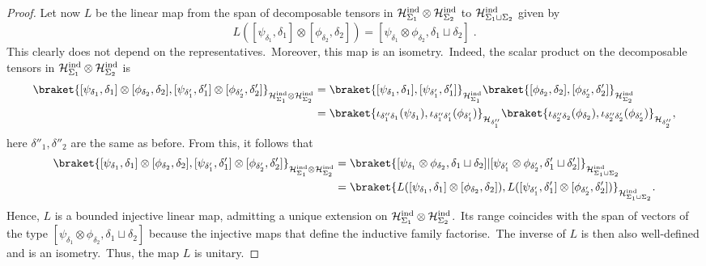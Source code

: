 \documentclass[11pt]{article}
\newcommand{\h}{\mathcal{H}}
\theoremstyle{definition}
\numberwithin{equation}{section}
\begin{document}
\begin{proof}
Let now $L$ be the linear map from the span of decomposable tensors in $\h_{\Sigma_1}^{\rm ind}\otimes\h_{\Sigma_2}^{\rm ind}$ to $\h_{\Sigma_1\sqcup\Sigma_2}^{\rm ind}$ given by
$$
L([\psi_{\delta_1},\delta_1]\otimes[\phi_{\delta_2},\delta_2])=[\psi_{\delta_1}\otimes\phi_{\delta_2} ,\delta_1\sqcup \delta_2]\;.
$$
This clearly does not depend on the representatives.~Moreover, this map is an isometry.~Indeed, the scalar product on the decomposable tensors in $\h_{\Sigma_1}^{\rm ind}\otimes\h_{\Sigma_2}^{\rm ind}$ is
    \begin{align*}
        \braket{[\psi_{\delta_1},\delta_1]\otimes[\phi_{\delta_2},\delta_2],[\psi_{\delta'_1},\delta'_1]\otimes[\phi_{\delta'_2},\delta'_2]}_{\h_{\Sigma_1}^{\rm ind}\otimes\h_{\Sigma_2}^{\rm ind}}&=\braket{[\psi_{\delta_1},\delta_1],[\psi_{\delta'_1},\delta'_1]}_{\h_{\Sigma_1}^{\rm ind}}\braket{[\phi_{\delta_2},\delta_2],[\phi_{\delta'_2},\delta'_2]}_{\h_{\Sigma_2}^{\rm ind}}\\
        &=\braket{\iota_{\delta''_1\delta_1}(\psi_{\delta_1}),\iota_{\delta''_1\delta'_1}(\phi_{\delta'_1})}_{\h_{\delta''_1}}\braket{\iota_{\delta''_2\delta_2}(\phi_{\delta_2}),\iota_{\delta''_2\delta'_2}(\phi_{\delta'_2})}_{\h_{\delta''_2}},
    \end{align*}
    here $\delta''_1,\delta''_2$ are the same as before. From this, it follows that
    \begin{align*}
        \braket{[\psi_{\delta_1},\delta_1]\otimes[\phi_{\delta_2},\delta_2],[\psi_{\delta'_1},\delta'_1]\otimes[\phi_{\delta'_2},\delta'_2]}_{\h_{\Sigma_1}^{\rm ind}\otimes\h_{\Sigma_2}^{\rm ind}}&=\braket{[\psi_{\delta_1}\otimes\phi_{\delta_2},\delta_1\sqcup\delta_2]|[\psi_{\delta'_1}\otimes\phi_{\delta'_2},\delta'_1\sqcup\delta'_2]}_{\h_{\Sigma_1\sqcup\Sigma_2}^{\rm ind}}\\
        &=\braket{L([\psi_{\delta_1},\delta_1]\otimes[\phi_{\delta_2},\delta_2]),L([\psi_{\delta'_1},\delta'_1]\otimes[\phi_{\delta'_2},\delta'_2])}_{\h_{\Sigma_1\sqcup\Sigma_2}^{\rm ind}}.
    \end{align*}
    Hence, $L$ is a bounded injective linear map, admitting a unique extension on $\h_{\Sigma_1}^{\rm ind}\otimes\h_{\Sigma_2}^{\rm ind}$.~Its range coincides with the span of vectors of the type $[\psi_{\delta_1}\otimes\phi_{\delta_2} ,\delta_1\sqcup \delta_2]$ because the injective maps that define the inductive family factorise.~The inverse of $L$ is then also well-defined and is an isometry.~Thus, the map $L$ is unitary.
\end{proof}
\end{document}
